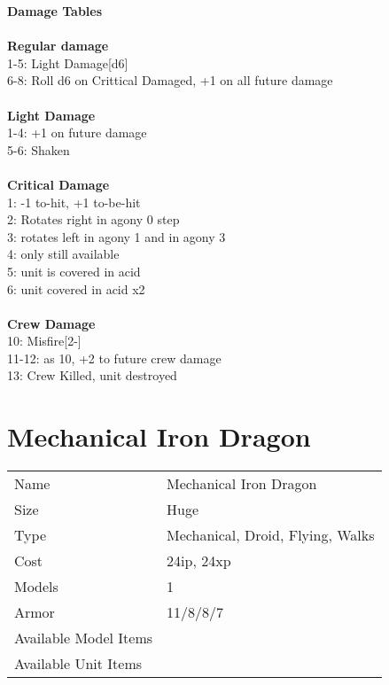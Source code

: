 {\bf Damage Tables} \\
\ \\ {\bf Regular damage } \\
1-5: Light Damage[d6] \\
6-8: Roll d6 on Crittical Damaged, +1 on all future damage \\
\ \\ {\bf Light Damage } \\
1-4: +1 on future damage \\
5-6: Shaken \\
\ \\ {\bf Critical Damage } \\
1: -1 to-hit, +1 to-be-hit \\
2: Rotates right in agony 0 step \\
3: rotates left in agony 1 and in agony 3 \\
4: only still available \\
5: unit is covered in acid \\
6: unit covered in acid x2 \\
\ \\ {\bf Crew Damage } \\
10: Misfire[2-] \\
11-12: as 10, +2 to future crew damage \\
13: Crew Killed, unit destroyed \\









\pagebreak

\section{ Mechanical Iron Dragon }

\begin{tabular}{ll}
  Name & Mechanical Iron Dragon \\
  Size & Huge\\
  Type & Mechanical, Droid, Flying, Walks\\
  Cost & 24ip, 24xp\\
  Models & 1\\
  Armor & 11/8/8/7\\
  Available Model Items &  \\
  Available Unit Items &  \\
\end{tabular}

